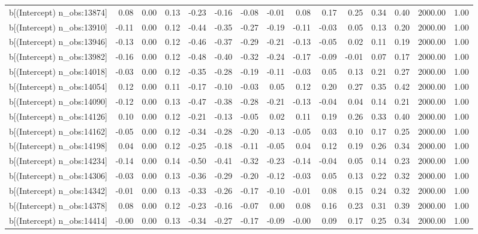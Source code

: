 \begin{table}[ht]
\begin{tabular}{rrrrrrrrrrrrrrr}
  b[(Intercept) n\_obs:13874] & 0.08 & 0.00 & 0.13 & -0.23 & -0.16 & -0.08 & -0.01 & 0.08 & 0.17 & 0.25 & 0.34 & 0.40 & 2000.00 & 1.00 \\ 
  b[(Intercept) n\_obs:13910] & -0.11 & 0.00 & 0.12 & -0.44 & -0.35 & -0.27 & -0.19 & -0.11 & -0.03 & 0.05 & 0.13 & 0.20 & 2000.00 & 1.00 \\ 
  b[(Intercept) n\_obs:13946] & -0.13 & 0.00 & 0.12 & -0.46 & -0.37 & -0.29 & -0.21 & -0.13 & -0.05 & 0.02 & 0.11 & 0.19 & 2000.00 & 1.00 \\ 
  b[(Intercept) n\_obs:13982] & -0.16 & 0.00 & 0.12 & -0.48 & -0.40 & -0.32 & -0.24 & -0.17 & -0.09 & -0.01 & 0.07 & 0.17 & 2000.00 & 1.00 \\ 
  b[(Intercept) n\_obs:14018] & -0.03 & 0.00 & 0.12 & -0.35 & -0.28 & -0.19 & -0.11 & -0.03 & 0.05 & 0.13 & 0.21 & 0.27 & 2000.00 & 1.00 \\ 
  b[(Intercept) n\_obs:14054] & 0.12 & 0.00 & 0.11 & -0.17 & -0.10 & -0.03 & 0.05 & 0.12 & 0.20 & 0.27 & 0.35 & 0.42 & 2000.00 & 1.00 \\ 
  b[(Intercept) n\_obs:14090] & -0.12 & 0.00 & 0.13 & -0.47 & -0.38 & -0.28 & -0.21 & -0.13 & -0.04 & 0.04 & 0.14 & 0.21 & 2000.00 & 1.00 \\ 
  b[(Intercept) n\_obs:14126] & 0.10 & 0.00 & 0.12 & -0.21 & -0.13 & -0.05 & 0.02 & 0.11 & 0.19 & 0.26 & 0.33 & 0.40 & 2000.00 & 1.00 \\ 
  b[(Intercept) n\_obs:14162] & -0.05 & 0.00 & 0.12 & -0.34 & -0.28 & -0.20 & -0.13 & -0.05 & 0.03 & 0.10 & 0.17 & 0.25 & 2000.00 & 1.00 \\ 
  b[(Intercept) n\_obs:14198] & 0.04 & 0.00 & 0.12 & -0.25 & -0.18 & -0.11 & -0.05 & 0.04 & 0.12 & 0.19 & 0.26 & 0.34 & 2000.00 & 1.00 \\ 
  b[(Intercept) n\_obs:14234] & -0.14 & 0.00 & 0.14 & -0.50 & -0.41 & -0.32 & -0.23 & -0.14 & -0.04 & 0.05 & 0.14 & 0.23 & 2000.00 & 1.00 \\ 
  b[(Intercept) n\_obs:14306] & -0.03 & 0.00 & 0.13 & -0.36 & -0.29 & -0.20 & -0.12 & -0.03 & 0.05 & 0.13 & 0.22 & 0.32 & 2000.00 & 1.00 \\ 
  b[(Intercept) n\_obs:14342] & -0.01 & 0.00 & 0.13 & -0.33 & -0.26 & -0.17 & -0.10 & -0.01 & 0.08 & 0.15 & 0.24 & 0.32 & 2000.00 & 1.00 \\ 
  b[(Intercept) n\_obs:14378] & 0.08 & 0.00 & 0.12 & -0.23 & -0.16 & -0.07 & 0.00 & 0.08 & 0.16 & 0.23 & 0.31 & 0.39 & 2000.00 & 1.00 \\ 
  b[(Intercept) n\_obs:14414] & -0.00 & 0.00 & 0.13 & -0.34 & -0.27 & -0.17 & -0.09 & -0.00 & 0.09 & 0.17 & 0.25 & 0.34 & 2000.00 & 1.00 \\ 

\end{tabular}
\end{table}
